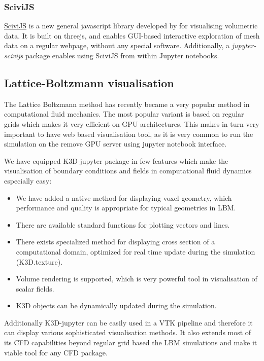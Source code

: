 \documentclass{deliverablereport}
\begin{document}
\subsubsection{SciviJS}

\href{https://demo.logilab.fr/SciviJS/}{SciviJS} is a new general javascript library
developed by \ODK for visualising volumetric data.
It is built on threejs, and enables GUI-based interactive exploration of mesh data
on a regular webpage, without any special software.
Additionally, a \emph{jupyter-scivijs} package enables using SciviJS from within
Jupyter notebooks.

\subsection{Lattice-Boltzmann visualisation}

The Lattice Boltzmann method has recently became a very popular method
in computational fluid mechanics. The most popular variant is based on
regular grids which makes it very efficient on GPU architectures. This
makes in turn very important to have web based visualisation tool, as
it is very common to run the simulation on the remove GPU server using
jupyter notebook interface.

We have equipped K3D-jupyter package in few features which make the
visualisation of boundary conditions and fields in computational
fluid dynamics especially easy:

\begin{itemize}
\item We have added a native method for displaying voxel geometry,
  which performance and quality is appropriate for typical geometries
  in LBM.
\item There are available standard functions for plotting vectors and lines.
\item There exists specialized method for displaying cross section of
  a computational domain, optimized for real time update during the
  simulation (K3D.texture).
\item Volume rendering is supported, which is very powerful tool in
  visualisation of scalar fields.
\item K3D objects can be dynamically updated during the simulation.
\end{itemize}

Additionally K3D-jupyter can be easily used in a VTK pipeline and
therefore it can display various sophisticated visualisation
methods. It also extends most of its CFD capabilities beyond regular
grid based the LBM simulations and make it viable tool for any CFD
package.
\end{document}
